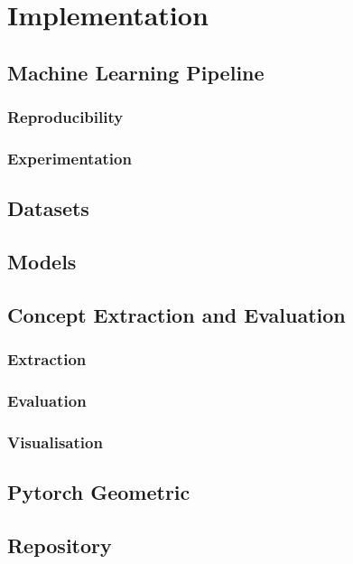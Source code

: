 \chapter{Implementation}

\section{Machine Learning Pipeline}

\subsection{Reproducibility}

\subsection{Experimentation}

\section{Datasets}

\section{Models}

\section{Concept Extraction and Evaluation}

\subsection{Extraction}

\subsection{Evaluation}

\subsection{Visualisation}

\section{Pytorch Geometric}

\section{Repository}
